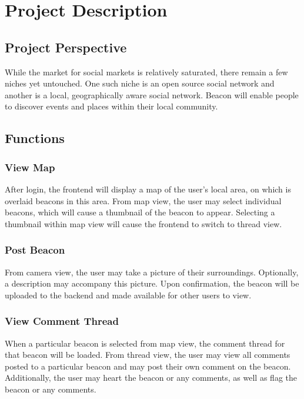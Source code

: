 \section{Project Description}

    \subsection{Project Perspective}
        While the market for social markets is relatively saturated, there remain a
        few niches yet untouched. One such niche is an open source social network
        and another is a local, geographically aware social network. Beacon will
        enable people to discover events and places within their local community.

    \subsection{Functions}
        \subsubsection{View Map}
            After login, the frontend will display a map of the user's local area,
            on which is overlaid beacons in this area. From map view, the user may
            select individual beacons, which will cause a thumbnail of the beacon to
            appear. Selecting a thumbnail within map view will cause the frontend to
            switch to thread view.

        \subsubsection{Post Beacon}
            From camera view, the user may take a picture of their surroundings.
            Optionally, a description may accompany this picture. Upon confirmation,
            the beacon will be uploaded to the backend and made available for other
            users to view.
            
        \subsubsection{View Comment Thread}
            When a particular beacon is selected from map view, the comment thread for
            that beacon will be loaded. From thread view, the user may view all
            comments posted to a particular beacon and may post their own comment on
            the beacon. Additionally, the user may heart the beacon or any comments,
            as well as flag the beacon or any comments.

